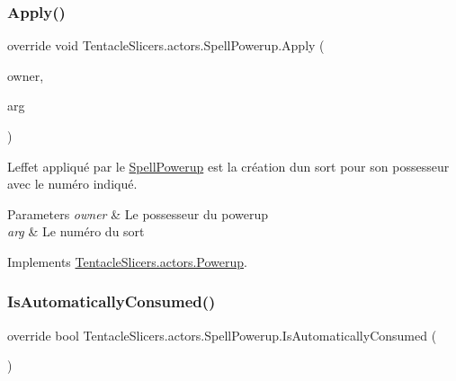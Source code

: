 \subsubsection{\texorpdfstring{Apply()}{Apply()}}
{\footnotesize\ttfamily override void Tentacle\+Slicers.\+actors.\+Spell\+Powerup.\+Apply (\begin{DoxyParamCaption}\item[{\hyperlink{class_tentacle_slicers_1_1actors_1_1_player_character}{Player\+Character}}]{owner,  }\item[{int}]{arg }\end{DoxyParamCaption})\hspace{0.3cm}{\ttfamily [virtual]}}



L\textquotesingle{}effet appliqué par le \hyperlink{class_tentacle_slicers_1_1actors_1_1_spell_powerup}{Spell\+Powerup} est la création d\textquotesingle{}un sort pour son possesseur avec le numéro indiqué. 


\begin{DoxyParams}{Parameters}
{\em owner} & Le possesseur du powerup \\
\hline
{\em arg} & Le numéro du sort \\
\hline
\end{DoxyParams}


Implements \hyperlink{class_tentacle_slicers_1_1actors_1_1_powerup_a65355e6ca82f35ca0d4ff111c03c8eee}{Tentacle\+Slicers.\+actors.\+Powerup}.

\mbox{\label{class_tentacle_slicers_1_1actors_1_1_spell_powerup_a9286f05a6eee9fb10532bf7439340bd8}} 
\subsubsection{\texorpdfstring{Is\+Automatically\+Consumed()}{IsAutomaticallyConsumed()}}
{\footnotesize\ttfamily override bool Tentacle\+Slicers.\+actors.\+Spell\+Powerup.\+Is\+Automatically\+Consumed (\begin{DoxyParamCaption}{ }\end{DoxyParamCaption})\hspace{0.3cm}{\ttfamily [virtual]}}



